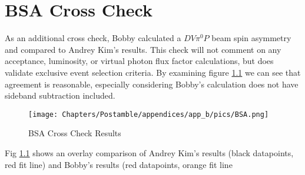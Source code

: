 \chapter{BSA Cross Check}

As an additional cross check, Bobby calculated a $DV\pi^0P$ beam spin asymmetry and compared to Andrey Kim's results. This check will not comment on any acceptance, luminosity, or virtual photon flux factor calculations, but does validate exclusive event selection criteria. By examining figure \ref{fig:bsa} we can see that agreement is reasonable, especially considering Bobby's calculation does not have sideband subtraction included.

\begin{figure}[hbt]
	\centering
	\texttt{[image: Chapters/Postamble/appendices/app\_b/pics/BSA.png]}
	
	
	\caption{BSA Cross Check Results}
	\label{fig:bsa}
\end{figure}

Fig \ref{fig:bsa} shows an overlay comparison of Andrey Kim's results (black datapoints, red fit line) and Bobby's results (red datapoints, orange fit line